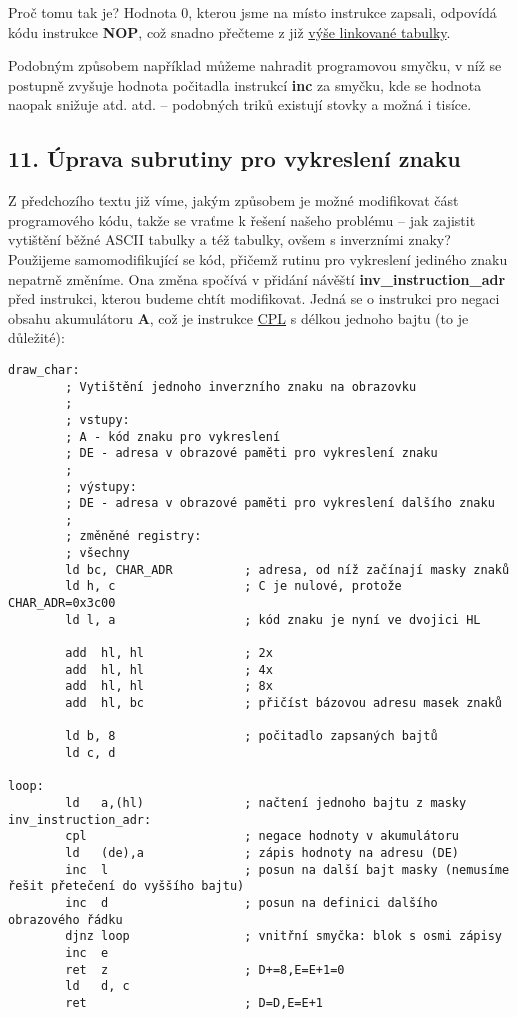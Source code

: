 \documentclass{article}
\begin{document}
Proč tomu tak je? Hodnota 0, kterou jsme na místo instrukce zapsali,
odpovídá kódu instrukce \textbf{NOP}, což snadno přečteme z již
\href{https://clrhome.org/table/\#nop}{výše linkované tabulky}.

Podobným způsobem například můžeme nahradit programovou smyčku, v níž se
postupně zvyšuje hodnota počitadla instrukcí \textbf{inc} za smyčku, kde
se hodnota naopak snižuje atd. atd. -- podobných triků existují stovky a
možná i tisíce.

\hypertarget{k11}{%
\subsection{11. Úprava subrutiny pro vykreslení znaku}\label{k11}}

Z předchozího textu již víme, jakým způsobem je možné modifikovat část
programového kódu, takže se vraťme k řešení našeho problému -- jak
zajistit vytištění běžné ASCII tabulky a též tabulky, ovšem s inverzními
znaky? Použijeme samomodifikující se kód, přičemž rutinu pro vykreslení
jediného znaku nepatrně změníme. Ona změna spočívá v přidání návěští
\textbf{inv\_instruction\_adr} před instrukci, kterou budeme chtít
modifikovat. Jedná se o instrukci pro negaci obsahu akumulátoru
\textbf{A}, což je instrukce \href{https://clrhome.org/table/\#cpl}{CPL}
s délkou jednoho bajtu (to je důležité):

\begin{verbatim}
draw_char:
        ; Vytištění jednoho inverzního znaku na obrazovku
        ;
        ; vstupy:
        ; A - kód znaku pro vykreslení
        ; DE - adresa v obrazové paměti pro vykreslení znaku
        ;
        ; výstupy:
        ; DE - adresa v obrazové paměti pro vykreslení dalšího znaku
        ;
        ; změněné registry:
        ; všechny
        ld bc, CHAR_ADR          ; adresa, od níž začínají masky znaků
        ld h, c                  ; C je nulové, protože CHAR_ADR=0x3c00
        ld l, a                  ; kód znaku je nyní ve dvojici HL
 
        add  hl, hl              ; 2x
        add  hl, hl              ; 4x
        add  hl, hl              ; 8x
        add  hl, bc              ; přičíst bázovou adresu masek znaků
 
        ld b, 8                  ; počitadlo zapsaných bajtů
        ld c, d
 
loop:
        ld   a,(hl)              ; načtení jednoho bajtu z masky
inv_instruction_adr:
        cpl                      ; negace hodnoty v akumulátoru
        ld   (de),a              ; zápis hodnoty na adresu (DE)
        inc  l                   ; posun na další bajt masky (nemusíme řešit přetečení do vyššího bajtu)
        inc  d                   ; posun na definici dalšího obrazového řádku
        djnz loop                ; vnitřní smyčka: blok s osmi zápisy
        inc  e
        ret  z                   ; D+=8,E=E+1=0
        ld   d, c
        ret                      ; D=D,E=E+1
\end{verbatim}
\end{document}
